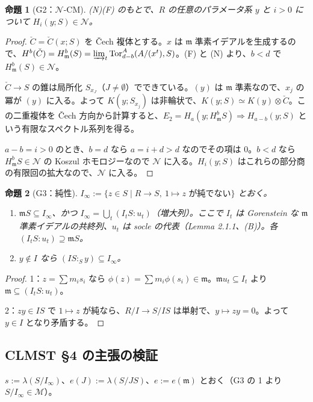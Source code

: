 \documentclass[11pt,a4paper]{ltjsarticle}
\theoremstyle{plain}
\theoremstyle{definition}
\theoremstyle{remark}
\theoremstyle{plain}
\newtheorem*{proposition*}{命題}
\newcommand{\m}{\mathfrak{m}}
\newcommand{\Tor}{\operatorname{Tor}}
\begin{document}
\begin{proposition*}[G2：$\mathcal{N}$-CM]
(N)(F) のもとで、$R$ の任意のパラメータ系 $y$ と $i>0$ について $H_i(y;S)\in\mathcal{N}$。
\end{proposition*}
\begin{proof}
$\check{C} = \check{C}(x;S)$ を Čech 複体とする。$x$ は $\m$ 準素イデアルを生成するので、$H^b(\check{C}) = H^b_\m(S) = \varinjlim_t\Tor^A_{d-b}(A/(x^t),S)$。(F) と (N) より、$b<d$ で $H^b_\m(S)\in\mathcal{N}$。

$\check{C}\to S$ の錐は局所化 $S_{x_J}$（$J\neq\emptyset$）でできている。$(y)$ は $\m$ 準素なので、$x_j$ の冪が $(y)$ に入る。よって $K(y;S_{x_j})$ は非輪状で、$K(y;S)\simeq K(y)\otimes\check{C}$。この二重複体を Čech 方向から計算すると、$E_2 = H_a(y;H^b_\m S)\Rightarrow H_{a-b}(y;S)$ という有限なスペクトル系列を得る。

$a-b = i>0$ のとき、$b = d$ なら $a = i+d>d$ なのでその項は $0$。$b<d$ なら $H^b_\m S\in\mathcal{N}$ の Koszul ホモロジーなので $\mathcal{N}$ に入る。$H_i(y;S)$ はこれらの部分商の有限回の拡大なので、$\mathcal{N}$ に入る。
\end{proof}

\begin{proposition*}[G3：純性]
$I_\infty := \{z\in S\mid R\to S,\ 1\mapsto z\text{ が純でない}\}$ とおく。
\begin{enumerate}
  \item $\m S\subseteq I_\infty$、かつ $I_\infty = \bigcup_t(I_tS:u_t)$（増大列）。ここで $I_t$ は Gorenstein な $\m$ 準素イデアルの共終列、$u_t$ は socle の代表（Lemma 2.1.1、(B)）。各 $(I_tS:u_t)\supseteq\m S$。
  \item $y\notin I$ なら $(IS:_Sy)\subseteq I_\infty$。
\end{enumerate}
\end{proposition*}
\begin{proof}
1：$z = \sum m_is_i$ なら $\phi(z) = \sum m_i\phi(s_i)\in\m$。$\m u_t\subseteq I_t$ より $\m\subseteq(I_tS:u_t)$。

2：$zy\in IS$ で $1\mapsto z$ が純なら、$R/I\to S/IS$ は単射で、$y\mapsto zy = 0$。よって $y\in I$ となり矛盾する。
\end{proof}

\subsection{CLMST \S 4 の主張の検証}
$s := \lambda(S/I_\infty)$、$e(J) := \lambda(S/JS)$、$e := e(\m)$ とおく（G3 の 1 より $S/I_\infty\in\mathcal{M}$）。
\end{document}
